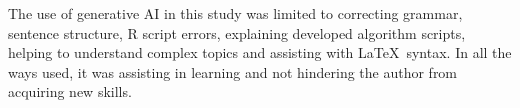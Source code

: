 

The use of generative AI in this study was limited to correcting grammar, sentence structure, R script errors, explaining developed algorithm scripts, helping to understand complex topics and assisting with \LaTeX\ syntax. In all the ways used, it was assisting in learning and not hindering the author from acquiring new skills. 